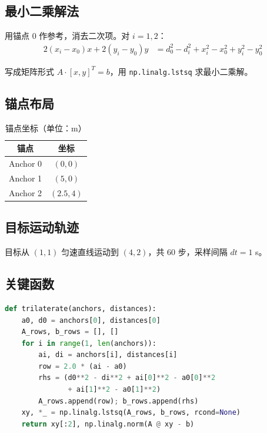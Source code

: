 \documentclass[11pt,a4paper]{article}
\newcommand{\code}[1]{\texttt{#1}}
\begin{document}
\subsection{最小二乘解法}

用锚点 0 作参考，消去二次项。对 $i = 1, 2$：
\begin{align}
2(x_i - x_0)x + 2(y_i - y_0)y &= d_0^2 - d_i^2 + x_i^2 - x_0^2 + y_i^2 - y_0^2
\end{align}

写成矩阵形式 $A \cdot [x, y]^T = b$，用 \code{np.linalg.lstsq} 求最小二乘解。

\subsection{锚点布局}

\begin{table}[H]
\centering
\caption{锚点坐标（单位：m）}
\begin{tabular}{cc}
\toprule
\textbf{锚点} & \textbf{坐标} \\
\midrule
Anchor 0 & $(0, 0)$ \\
Anchor 1 & $(5, 0)$ \\
Anchor 2 & $(2.5, 4)$ \\
\bottomrule
\end{tabular}
\end{table}

\subsection{目标运动轨迹}

目标从 $(1, 1)$ 匀速直线运动到 $(4, 2)$，共 60 步，采样间隔 $dt = 1$ s。

\subsection{关键函数}

\begin{lstlisting}[language=Python, caption={三边定位函数}]
def trilaterate(anchors, distances):
    a0, d0 = anchors[0], distances[0]
    A_rows, b_rows = [], []
    for i in range(1, len(anchors)):
        ai, di = anchors[i], distances[i]
        row = 2.0 * (ai - a0)
        rhs = (d0**2 - di**2 + ai[0]**2 - a0[0]**2
               + ai[1]**2 - a0[1]**2)
        A_rows.append(row); b_rows.append(rhs)
    xy, *_ = np.linalg.lstsq(A_rows, b_rows, rcond=None)
    return xy[:2], np.linalg.norm(A @ xy - b)
\end{lstlisting}
\end{document}
